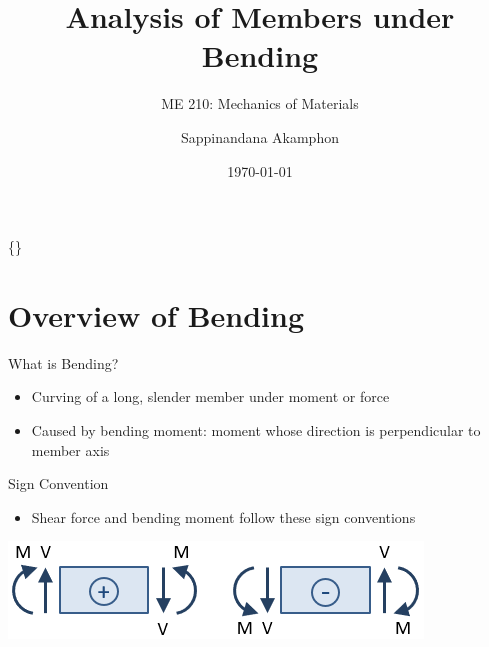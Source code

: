 \documentclass[10pt, svgnames]{beamer}
\author{Sappinandana Akamphon}
\date{\today}
\title{Analysis of Members under Bending}
\subtitle{ME 210: Mechanics of Materials}
\institute{Department of Mechanical Engineering, TSE}
\date{}
\begin{document}
\begin{frame}[label={sec:org1af32d2}]{\{\}}
\maketitle
\end{frame}

\section{Overview of Bending}
\label{overview-of-bending}
\begin{frame}[label={sec:org9ebdfbe}]{What is Bending?}
\begin{itemize}
\item Curving of a long, slender member under moment or force

\item Caused by bending moment: moment whose direction is perpendicular to member axis
\end{itemize}
\end{frame}

\begin{frame}[label={sec:org3a83932}]{Sign Convention}
\begin{itemize}
\item Shear force and bending moment follow these sign conventions
\end{itemize}

\begin{center}
\includegraphics[width=.9\linewidth]{pictures/sign-convention.png}
\end{center}
\end{frame}
\end{document}
